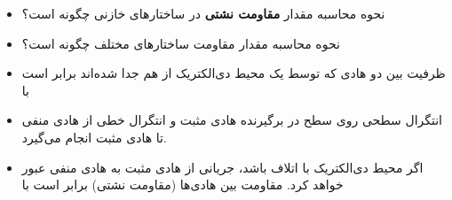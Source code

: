\begin{ELjoin}
\begin{ELexample}{}
\begin{ELsolution}

\end{ELsolution}

\end{ELexample}

\end{ELjoin}

\ELhold


\begin{ELunit}


\begin{itemize}
\item
  نحوه محاسبه مقدار \textbf{مقاومت نشتی} در ساختارهای خازنی چگونه است؟
\item
  نحوه محاسبه مقدار مقاومت ساختارهای مختلف چگونه است؟
\item
  ظرفیت بین دو هادی که توسط یک محیط دی‌الکتریک از هم جدا شده‌اند برابر است با
\end{itemize}


\begin{itemize}
\tightlist
\item
  انتگرال سطحی روی سطح در برگیرنده هادی مثبت و انتگرال خطی از هادی منفی تا هادی مثبت انجام می‌گیرد.
\item
  اگر محیط دی‌الکتریک با اتلاف باشد، جریانی از هادی مثبت به هادی منفی عبور خواهد کرد. مقاومت بین هادی‌ها (مقاومت نشتی) برابر است با
\end{itemize}


\end{ELunit}

